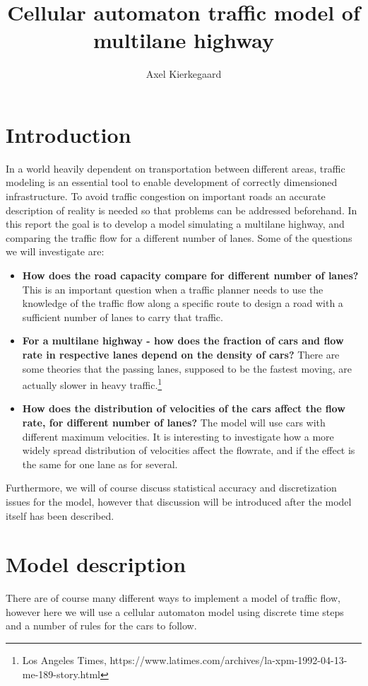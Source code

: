 \documentclass[a4paper,12pt]{article}
\title{Cellular automaton traffic model of multilane highway}
\author{Axel Kierkegaard}
\begin{document}
\maketitle

\section{Introduction}
In a world heavily dependent on transportation between different areas, traffic modeling is an essential tool to enable development of correctly dimensioned infrastructure. To avoid traffic congestion on important roads an accurate description of reality is needed so that problems can be addressed beforehand. In this report the goal is to develop a model simulating a multilane highway, and comparing the traffic flow for a different number of lanes. Some of the questions we will investigate are:

\begin{itemize}
  \item \textbf{How does the road capacity compare for different number of lanes?}
  This is an important question when a traffic planner needs to use the knowledge of the traffic flow along a specific route to design a road with a sufficient number of lanes to carry that traffic.
  \item \textbf{For a multilane highway - how does the fraction of cars and flow rate in respective lanes depend on the density of cars?} There are some theories that the passing lanes, supposed to be the fastest moving, are actually slower in heavy traffic.\footnote{Los Angeles Times, https://www.latimes.com/archives/la-xpm-1992-04-13-me-189-story.html}
  \item \textbf{How does the distribution of velocities of the cars affect the flow rate, for different number of lanes?} The model will use cars with different maximum velocities. It is interesting to investigate how a more widely spread distribution of velocities affect the flowrate, and if the effect is the same for one lane as for several.
\end{itemize}

Furthermore, we will of course discuss statistical accuracy and discretization issues for the model, however that discussion will be introduced after the model itself has been described.

\section{Model description}
There are of course many different ways to implement a model of traffic flow, however here we will use a cellular automaton model using discrete time steps and a number of rules for the cars to follow. 
\end{document}
